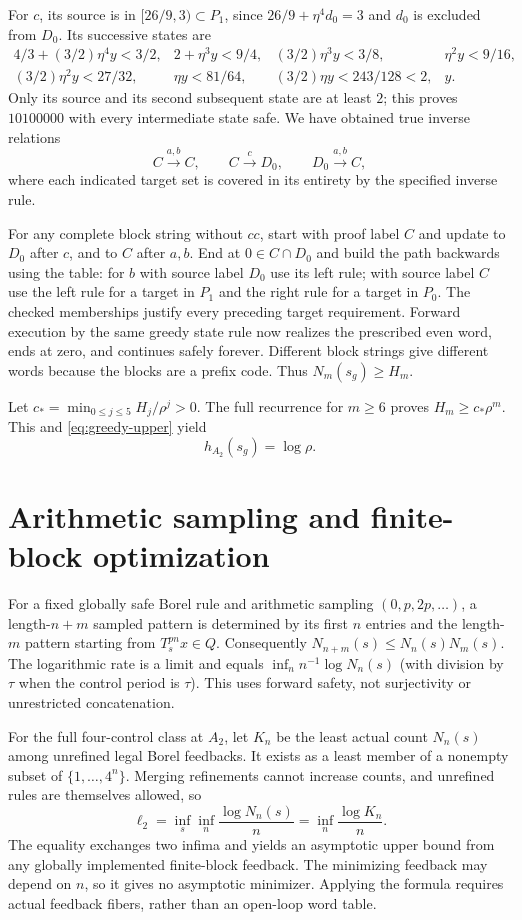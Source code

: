 \documentclass[11pt,reqno]{amsart}
\numberwithin{equation}{section}
\theoremstyle{definition}
\theoremstyle{definition}
\begin{document}
For $c$, its source is in $[26/9,3)\subset P_1$, since
$26/9+\eta^4d_0=3$ and $d_0$ is excluded from $D_0$.
Its successive states are
\[
\begin{array}{llll}
4/3+(3/2)\eta^4y<3/2,&2+\eta^3y<9/4,&
(3/2)\eta^3y<3/8,&\eta^2y<9/16,\\
(3/2)\eta^2y<27/32,&\eta y<81/64,&
(3/2)\eta y<243/128<2,&y.
\end{array}
\]
Only its source and its second subsequent state are at least $2$;
this proves $10100000$ with every intermediate
state safe. We have obtained true inverse relations
\[
 C\xrightarrow{a,b}C,\qquad C\xrightarrow cD_0,
 \qquad D_0\xrightarrow{a,b}C,
\]
where each indicated target set is covered in its entirety by the
specified inverse rule.

For any complete block string without $cc$, start with proof label
$C$ and update to $D_0$ after $c$, and to $C$ after $a,b$.
End at $0\in C\cap D_0$ and build the path backwards using
the table: for $b$ with source label $D_0$ use its left rule;
with source label $C$ use the left rule for a target in $P_1$
and the right rule for a target in $P_0$. The checked memberships
justify every preceding target requirement. Forward execution by
the same greedy state rule now realizes the prescribed even word,
ends at zero, and continues safely forever. Different block strings
give different words because the blocks are a prefix code. Thus
$N_m(s_g)\ge H_m$.

Let $c_* =\min_{0\le j\le5}H_j/\rho^j>0$. The full recurrence
for $m\ge6$ proves $H_m\ge c_*\rho^m$. This and
\eqref{eq:greedy-upper} yield
\begin{equation}\label{eq:greedy-exact}
 h_{A_2}(s_g)=\log\rho.
\end{equation}
\section{Arithmetic sampling and finite-block optimization}
\label{app:finiteblock}
For a fixed globally safe Borel rule and arithmetic sampling
$(0,p,2p,\ldots)$, a length-$n+m$ sampled pattern is determined
by its first $n$ entries and the length-$m$ pattern starting from
$T_s^{pn}x\in Q$. Consequently $N_{n+m}(s)\le N_n(s)N_m(s)$.
The logarithmic rate is a limit and equals
$\inf_n n^{-1}\log N_n(s)$ (with division by $\tau$ when
the control period is $\tau$). This uses forward safety, not
surjectivity or unrestricted concatenation.

For the full four-control class at $A_2$, let $K_n$ be the least
actual count $N_n(s)$ among unrefined legal Borel feedbacks.
It exists as a least member of a nonempty subset of
$\{1,\ldots,4^n\}$. Merging refinements cannot increase counts,
and unrefined rules are themselves allowed, so
\begin{equation}\label{eq:finiteblock}
 \ell_2=\inf_s\inf_n\frac{\log N_n(s)}n
 =\inf_n\frac{\log K_n}n.
\end{equation}
The equality exchanges two infima and yields an asymptotic upper
bound from any globally implemented finite-block feedback. The
minimizing feedback may depend on $n$, so it gives no asymptotic
minimizer. Applying the formula requires actual feedback fibers,
rather than an open-loop word table.
\end{document}
